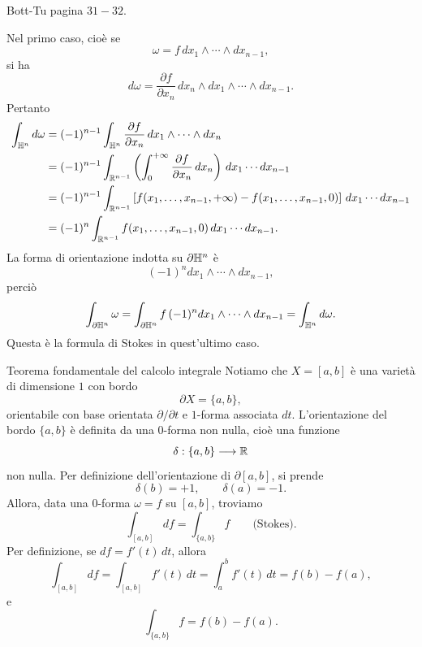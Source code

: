 \documentclass[a4paper]{article}
\begin{document}
\begin{snippetproof}{Bott-Tu pagina \(31-32\).}
\begin{itemize}
        Nel primo caso, cioè se
        \[
        \omega=f\,dx_1\wedge\cdots\wedge dx_{n-1},
        \]
        si ha
        \[
         d\omega=\frac{\partial f}{\partial x_n}\,dx_n\wedge dx_1\wedge\cdots\wedge dx_{n-1}.
        \]
        Pertanto
        \[
        \begin{aligned}
        \int_{\mathbb{H}^n}d\omega
        &=(-1)^{n-1}
        \int_{\mathbb{H}^n}\frac{\partial f}{\partial x_n}\,dx_1\wedge\cdots\wedge dx_n \\
        &=(-1)^{n-1}\int_{\mathbb{R}^{n-1}}\left(\int_0^{+\infty}\frac{\partial f}{\partial x_n}\,dx_n\right)
        \,dx_1\cdots dx_{n-1} \\
        &=(-1)^{n-1}\int_{\mathbb{R}^{n-1}}
        \left[f(x_1,\ldots,x_{n-1},+\infty)-f(x_1,\ldots,x_{n-1},0)\right]
        \,dx_1\cdots dx_{n-1} \\
        &=(-1)^n\int_{\mathbb{R}^{n-1}}f(x_1,\ldots,x_{n-1},0)
        \,dx_1\cdots dx_{n-1}.
        \end{aligned}
        \]
        La forma di orientazione indotta su \(\partial\mathbb{H}^n\) è
        \[
        (-1)^n dx_1\wedge\cdots\wedge dx_{n-1},
        \]
        perciò
        \[
        \int_{\partial\mathbb{H}^n}\omega
        =
        \int_{\partial\mathbb{H}^n}f\,(-1)^n dx_1\wedge\cdots\wedge dx_{n-1}
        =
        \int_{\mathbb{H}^n}d\omega.
        \]
        Questa è la formula di Stokes in quest'ultimo caso.
    \end{itemize}
\end{snippetproof}

\begin{snippetexample}{Teorema fondamentale del calcolo integrale}
    Notiamo che \(X=[a,b]\) è una varietà di dimensione \(1\) con bordo
    \[
    \partial X=\{a,b\},
    \]
    orientabile con base orientata \(\partial/\partial t\) e \(1\)-forma associata \(dt\).
    L'orientazione del bordo \(\{a,b\}\) è definita da una \(0\)-forma non nulla, cioè una funzione
    \[
    \delta:\{a,b\}\longrightarrow\mathbb{R}
    \]
    non nulla. Per definizione dell'orientazione di \(\partial[a,b]\), si prende
    \[
    \delta(b)=+1,
    \qquad
    \delta(a)=-1.
    \]
    Allora, data una \(0\)-forma \(\omega=f\) su \([a,b]\), troviamo
    \[
    \int_{[a,b]}df=\int_{\{a,b\}}f
    \qquad\text{(Stokes)}.
    \]
    Per definizione, se \(df=f'(t)\,dt\), allora
    \[
    \int_{[a,b]}df
    =
    \int_{[a,b]}f'(t)\,dt
    =
    \int_a^b f'(t)\,dt
    =f(b)-f(a),
    \]
    e
    \[
    \int_{\{a,b\}}f=f(b)-f(a).
    \]
\end{snippetexample}
\end{document}
